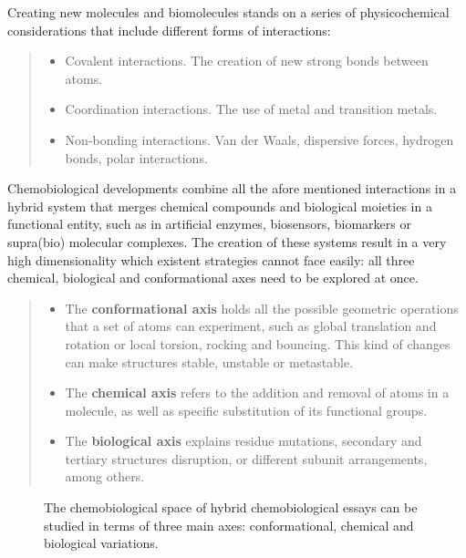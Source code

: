 Creating new molecules and biomolecules stands on a series of physicochemical considerations that include different forms of interactions:
%
\begin{quote}
%
\begin{itemize}

\item Covalent interactions. The creation of new strong bonds between atoms.

\item Coordination interactions. The use of metal and transition metals.

\item Non-bonding interactions. Van der Waals, dispersive forces, hydrogen bonds, polar interactions.

\end{itemize}

\end{quote}

Chemobiological developments combine all the afore mentioned interactions in a hybrid system that merges chemical compounds and biological moieties in a functional entity, such as in artificial enzymes, biosensors, biomarkers or supra(bio) molecular complexes. The creation of these systems result in a very high dimensionality which existent strategies cannot face easily: all three chemical, biological and conformational axes need to be explored at once.
%
\begin{quote}
%
\begin{itemize}

\item The \textbf{conformational axis} holds all the possible geometric operations that a set of atoms can experiment, such as global translation and rotation or local torsion, rocking and bouncing. This kind of changes can make structures stable, unstable or metastable.

\item The \textbf{chemical axis} refers to the addition and removal of atoms in a molecule, as well as specific substitution of its functional groups.

\item The \textbf{biological axis} explains residue mutations, secondary and tertiary structures disruption, or different subunit arrangements, among others.

\end{itemize}

\end{quote}
\begin{figure}
\noindent{}
\caption{The chemobiological space of hybrid chemobiological essays can be studied in terms of three main axes: conformational, chemical and biological variations.}
\end{figure}

